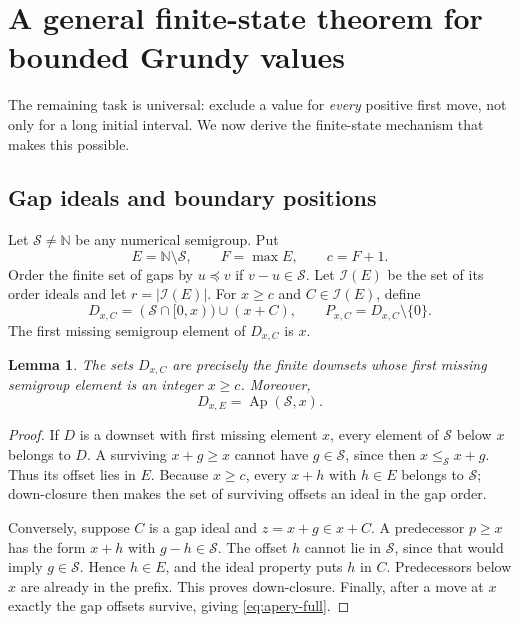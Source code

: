 \documentclass[11pt,letterpaper]{article}
\numberwithin{equation}{section}
\newtheorem{lemma}[theorem]{Lemma}
\theoremstyle{definition}
\newcommand{\N}{\mathbb N}
\newcommand{\Sg}{\mathcal S}
\newcommand{\Ap}{\operatorname{Ap}}
\begin{document}
\section{A general finite-state theorem for bounded Grundy values}
\label{sec:automaton}

The remaining task is universal: exclude a value for \emph{every} positive
first move, not only for a long initial interval. We now derive the
finite-state mechanism that makes this possible.

\subsection{Gap ideals and boundary positions}

Let $\Sg\neq\N$ be any numerical semigroup. Put
\[
 E=\N\setminus\Sg,\qquad F=\max E,\qquad c=F+1.
\]
Order the finite set of gaps by $u\preceq v$ if $v-u\in\Sg$.
Let $\mathcal I(E)$ be the set of its order ideals and let
$r=|\mathcal I(E)|$.
For $x\geq c$ and $C\in\mathcal I(E)$, define
\begin{equation}\label{eq:boundary-board}
 D_{x,C}=(\Sg\cap[0,x))\cup(x+C),
 \qquad
 P_{x,C}=D_{x,C}\setminus\{0\}.
\end{equation}
The first missing semigroup element of $D_{x,C}$ is $x$.

\begin{lemma}\label{lem:boundary}
The sets $D_{x,C}$ are precisely the finite downsets whose first missing
semigroup element is an integer $x\geq c$. Moreover,
\begin{equation}\label{eq:apery-full}
 D_{x,E}=\Ap(\Sg,x).
\end{equation}
\end{lemma}

\begin{proof}
If $D$ is a downset with first missing element $x$, every element of
$\Sg$ below $x$ belongs to $D$. A surviving $x+g\geq x$ cannot have
$g\in\Sg$, since then $x\leq_{\Sg}x+g$. Thus its offset lies in $E$.
Because $x\geq c$, every $x+h$ with $h\in E$ belongs to $\Sg$; down-closure
then makes the set of surviving offsets an ideal in the gap order.

Conversely, suppose $C$ is a gap ideal and $z=x+g\in x+C$. A predecessor
$p\geq x$ has the form $x+h$ with $g-h\in\Sg$. The offset $h$ cannot lie
in $\Sg$, since that would imply $g\in\Sg$. Hence $h\in E$, and the
ideal property puts $h$ in $C$. Predecessors below $x$ are already in the
prefix. This proves down-closure. Finally, after a move at $x$ exactly the
gap offsets survive, giving \cref{eq:apery-full}.
\end{proof}
\end{document}
